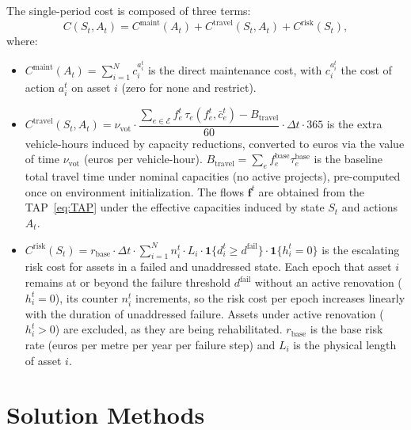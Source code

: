 \documentclass[3p, twocolumn]{elsarticle}
\begin{document}
The single-period cost is composed of three terms:
\begin{equation}
    C(S_t, A_t) = C^{\text{maint}}(A_t) + C^{\text{travel}}(S_t, A_t) + C^{\text{risk}}(S_t),
    \label{eq:cost}
\end{equation}
where:

\begin{itemize}
    \item $C^{\text{maint}}(A_t) = \sum_{i=1}^{N} c_i^{a_i^t}$ is the direct maintenance cost, with $c_i^{a_i^t}$ the cost of action $a_i^t$ on asset $i$ (zero for \textsf{none} and \textsf{restrict}).

    \item $C^{\text{travel}}(S_t, A_t) = \nu_{\text{vot}} \cdot
    \dfrac{\displaystyle\sum_{e \in \mathcal{E}} f_e^t \,\tau_e(f_e^t, \bar{c}_e^t) - B_{\text{travel}}}{60}
    \cdot \Delta t \cdot 365$
    is the extra vehicle-hours induced by capacity reductions, converted to euros via the value of time $\nu_{\text{vot}}$ (euros per vehicle-hour). $B_{\text{travel}} = \sum_e f_e^{\text{base}} \tau_e^{\text{base}}$ is the baseline total travel time under nominal capacities (no active projects), pre-computed once on environment initialization. The flows $\mathbf{f}^t$ are obtained from the TAP~\eqref{eq:TAP} under the effective capacities induced by state $S_t$ and actions $A_t$.

    \item $C^{\text{risk}}(S_t) = r_{\text{base}} \cdot \Delta t \cdot
    \sum_{i=1}^{N} n_i^t \cdot L_i \cdot \mathbf{1}\{d_i^t \geq d^{\text{fail}}\}
    \cdot \mathbf{1}\{h_i^t = 0\}$
    is the escalating risk cost for assets in a failed and unaddressed state. Each epoch that asset $i$ remains at or beyond the failure threshold $d^{\text{fail}}$ without an active renovation ($h_i^t = 0$), its counter $n_i^t$ increments, so the risk cost per epoch increases linearly with the duration of unaddressed failure. Assets under active renovation ($h_i^t > 0$) are excluded, as they are being rehabilitated. $r_{\text{base}}$ is the base risk rate (euros per metre per year per failure step) and $L_i$ is the physical length of asset $i$.
\end{itemize}

\section{Solution Methods}
\label{sec:methodology}
\end{document}
